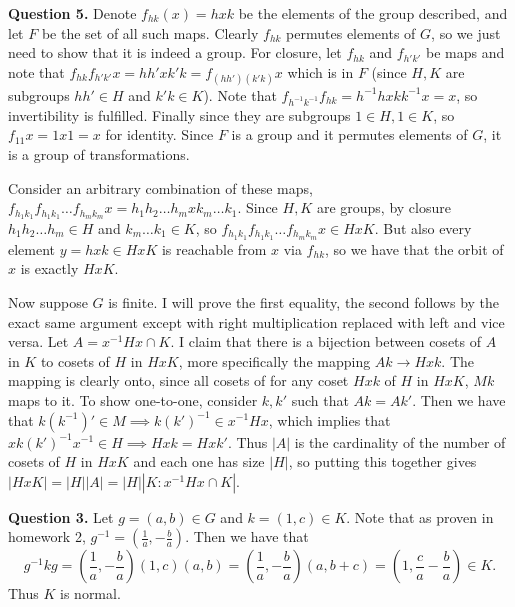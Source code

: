 \documentclass[letterpaper, reqno,11pt]{article}
\begin{document}
{\medskip\noindent\bf Question 5.} Denote $f_{hk}(x)=hxk$ be the elements of the group described, and let $F$ be the set of all such maps. Clearly $f_{hk}$ permutes elements of $G$, so we just need to show that it is indeed a group. For closure, let $f_{hk}$ and $f_{h'k'}$ be maps and note that $f_{hk}f_{h'k'}x=hh'xk'k=f_{(hh')(k'k)}x$ which is in $F$ (since $H,K$ are subgroups $hh'\in H$ and $k'k\in K$). Note that $f_{h^{-1}k^{-1}}f_{hk}=h^{-1}hxkk^{-1}x=x$, so invertibility is fulfilled. Finally since they are subgroups $1\in H,1\in K$, so $f_{11}x=1x1=x$ for identity. Since $F$ is a group and it permutes elements of $G$, it is a group of transformations.

Consider an arbitrary combination of these maps, $f_{h_1k_1}f_{h_1k_1}\ldots f_{h_mk_m}x=h_1h_2\ldots h_mxk_m\ldots k_1$. Since $H,K$ are groups, by closure $h_1h_2\ldots h_m\in H$ and $k_m\ldots k_1\in K$, so $f_{h_1k_1}f_{h_1k_1}\ldots f_{h_mk_m}x\in HxK$. But also every element $y=hxk\in HxK$ is reachable from $x$ via $f_{hk}$, so we have that the orbit of $x$ is exactly $HxK$.

Now suppose $G$ is finite. I will prove the first equality, the second follows by the exact same argument except with right multiplication replaced with left and vice versa. Let $A=x^{-1}Hx\cap K$. I claim that there is a bijection between cosets of $A$ in $K$ to cosets of $H$ in $HxK$, more specifically the mapping $Ak\to Hxk$. The mapping is clearly onto, since all cosets of for any coset $Hxk$ of $H$ in $HxK$, $Mk$ maps to it. To show one-to-one, consider $k,k'$ such that $Ak=Ak'$. Then we have that $k(k^{-1})'\in M\implies k(k')^{-1}\in x^{-1}Hx$, which implies that $xk(k')^{-1}x^{-1}\in H\implies Hxk=Hxk'$. Thus $|A|$ is the cardinality of the number of cosets of $H$ in $HxK$ and each one has size $|H|$, so putting this together gives $|HxK|=|H||A|=|H| \left| K:x^{-1} Hx\cap K \right| $.

{\medskip\noindent\bf Question 3.} Let $g=(a,b)\in G$ and $k=(1,c)\in K$. Note that as proven in homework 2, $g^{-1}=(\frac{1}{a},-\frac{b}{a})$. Then we have that
\[
g^{-1}kg=\left( \frac{1}{a},-\frac{b}{a} \right) \left( 1,c \right) (a,b)=\left( \frac{1}{a},-\frac{b}{a} \right)\left( a,b+c \right) =(1,\frac{c}{a}-\frac{b}{a})\in K
.\]
Thus $K$ is normal.
\end{document}
